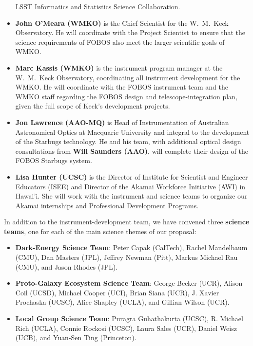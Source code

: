 \documentclass[oneside,11pt]{amsart}
\begin{document}
\begin{itemize}
LSST Informatics and Statistics Science Collaboration.\\[-5pt]
%
\item {\bf John O'Meara (WMKO)} is the Chief Scientist for the
W.~M.~Keck Observatory.  He will coordinate with the Project Scientist
to ensure that the science requirements of FOBOS also meet the larger
scientific goals of WMKO.\\[-5pt]
%
\item {\bf Marc Kassis (WMKO)} is the instrument program manager at the
W.~M.~Keck Observatory, coordinating all instrument development for the
WMKO.  He will coordinate with the FOBOS instrument team and the WMKO
staff regarding the FOBOS design and telescope-integration plan, given
the full scope of Keck's development projects.\\[-5pt]
%
\item {\bf Jon Lawrence (AAO-MQ)} is Head of Instrumentation of
Australian Astronomical Optics at Macquarie University and integral to
the development of the Starbugs technology.  He and his team, with
additional optical design consultations from {\bf Will Saunders (AAO)},
will complete their design of the FOBOS Starbugs system.\\[-5pt]
%
\item {\bf Lisa Hunter (UCSC)} is the Director of Institute for
Scientist and Engineer Educators (ISEE) and Director of the Akamai
Workforce Initiative (AWI) in Hawai'i. She will work with the instrument
and science teams to organize our Akamai internships and Professional
Development Programs.
%
\end{itemize}

\newpage

\noindent In addition to the instrument-development team, we have
convened three {\bf science teams}, one for each of the main science
themes of our proposal:
%
\begin{itemize}
%
\item {\bf Dark-Energy Science Team}: Peter Capak (CalTech), Rachel
Mandelbaum (CMU), Dan Masters (JPL), Jeffrey Newman (Pitt), Markus
Michael Rau (CMU), and Jason Rhodes (JPL).\\[-5pt]
%
\item {\bf Proto-Galaxy Ecosystem Science Team}: George Becker (UCR),
Alison Coil (UCSD), Michael Cooper (UCI), Brian Siana (UCR), J. Xavier
Prochaska (UCSC), Alice Shapley (UCLA), and Gillian Wilson
(UCR).\\[-5pt]
%
\item {\bf Local Group Science Team}: Puragra Guhathakurta (UCSC), R.
Michael Rich (UCLA), Connie Rockosi (UCSC), Laura Sales (UCR), Daniel
Weisz (UCB), and Yuan-Sen Ting (Princeton).
%
\end{itemize}
\end{document}
